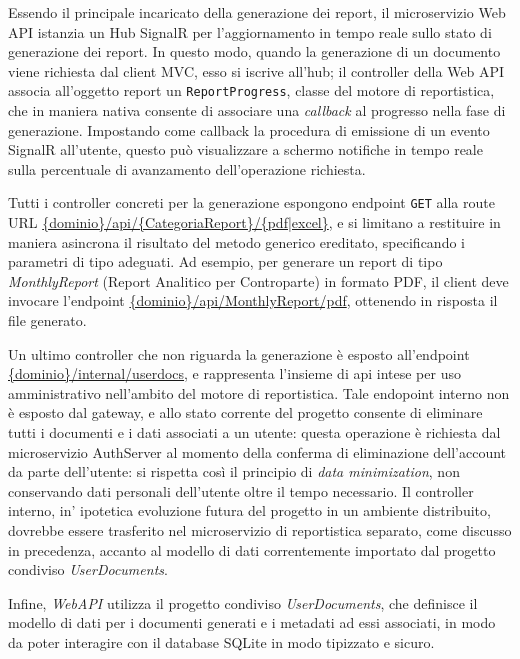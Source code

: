 Essendo il principale incaricato della generazione dei report, il microservizio Web API istanzia un Hub SignalR per l'aggiornamento in tempo reale sullo stato di generazione dei report. In questo modo, quando la generazione di un documento viene richiesta dal client MVC, esso si iscrive all'hub; il controller della Web API associa all'oggetto report un \texttt{ReportProgress}, classe del motore di reportistica, che in maniera nativa consente di associare una \emph{callback} al progresso nella fase di generazione. Impostando come callback la procedura di emissione di un evento SignalR all'utente, questo può visualizzare a schermo notifiche in tempo reale sulla percentuale di avanzamento dell'operazione richiesta.

Tutti i controller concreti per la generazione espongono endpoint \texttt{GET} alla route URL \url{{dominio}/api/{CategoriaReport}/{pdf|excel}}, e si limitano a restituire in maniera asincrona il risultato del metodo generico ereditato, specificando i parametri di tipo adeguati. Ad esempio, per generare un report di tipo \emph{MonthlyReport} (Report Analitico per Controparte) in formato PDF, il client deve invocare l'endpoint
\url{{dominio}/api/MonthlyReport/pdf}, ottenendo in risposta il file generato.

Un ultimo controller che non riguarda la generazione è esposto all'endpoint \url{{dominio}/internal/userdocs}, e rappresenta l'insieme di api intese per uso amministrativo nell'ambito del motore di reportistica. Tale endopoint interno non è esposto dal gateway, e allo stato corrente del progetto consente di eliminare tutti i documenti e i dati associati a un utente: questa operazione è richiesta dal microservizio AuthServer al momento della conferma di eliminazione dell'account da parte dell'utente: si rispetta così il principio di \emph{data minimization}, non conservando dati personali dell'utente oltre il tempo necessario.
Il controller interno, in' ipotetica evoluzione futura del progetto in un ambiente distribuito, dovrebbe essere trasferito nel microservizio di reportistica separato, come discusso in precedenza, accanto al modello di dati correntemente importato dal progetto condiviso \emph{UserDocuments}.

Infine, \emph{WebAPI} utilizza il progetto condiviso \emph{UserDocuments}, che definisce il modello di dati per i documenti generati e i metadati ad essi associati, in modo da poter interagire con il database SQLite in modo tipizzato e sicuro.

